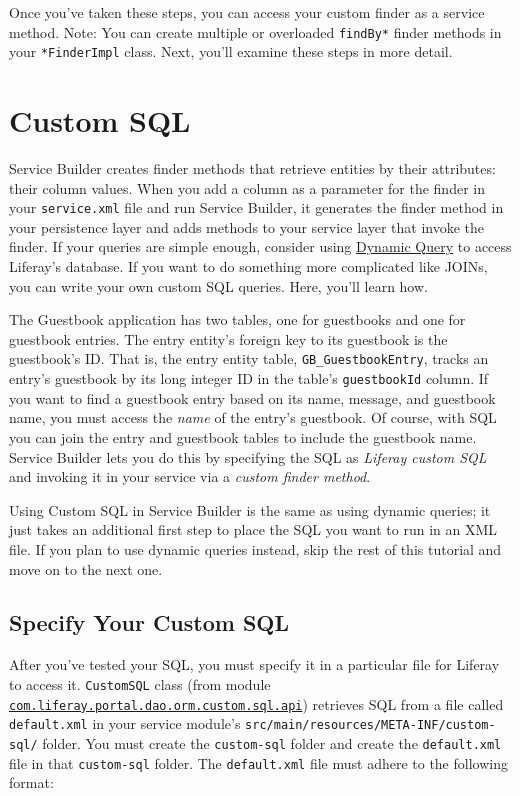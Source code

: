 Once you've taken these steps, you can access your custom finder as a
service method. Note: You can create multiple or overloaded
\texttt{findBy*} finder methods in your \texttt{*FinderImpl} class.
Next, you'll examine these steps in more detail.

\chapter{Custom SQL}\label{custom-sql}

Service Builder creates finder methods that retrieve entities by their
attributes: their column values. When you add a column as a parameter
for the finder in your \texttt{service.xml} file and run Service
Builder, it generates the finder method in your persistence layer and
adds methods to your service layer that invoke the finder. If your
queries are simple enough, consider using
\href{/docs/7-2/appdev/-/knowledge_base/a/dynamic-query}{Dynamic Query}
to access Liferay's database. If you want to do something more
complicated like JOINs, you can write your own custom SQL queries. Here,
you'll learn how.

The Guestbook application has two tables, one for guestbooks and one for
guestbook entries. The entry entity's foreign key to its guestbook is
the guestbook's ID. That is, the entry entity table,
\texttt{GB\_GuestbookEntry}, tracks an entry's guestbook by its long
integer ID in the table's \texttt{guestbookId} column. If you want to
find a guestbook entry based on its name, message, and guestbook name,
you must access the \emph{name} of the entry's guestbook. Of course,
with SQL you can join the entry and guestbook tables to include the
guestbook name. Service Builder lets you do this by specifying the SQL
as \emph{Liferay custom SQL} and invoking it in your service via a
\emph{custom finder method}.

Using Custom SQL in Service Builder is the same as using dynamic
queries; it just takes an additional first step to place the SQL you
want to run in an XML file. If you plan to use dynamic queries instead,
skip the rest of this tutorial and move on to the next one.

\section{Specify Your Custom SQL}\label{specify-your-custom-sql}

After you've tested your SQL, you must specify it in a particular file
for Liferay to access it. \texttt{CustomSQL} class (from module
\href{https://repository.liferay.com/nexus/content/repositories/liferay-public-releases/com/liferay/com.liferay.portal.dao.orm.custom.sql.api/}{\texttt{com.liferay.portal.dao.orm.custom.sql.api}})
retrieves SQL from a file called \texttt{default.xml} in your service
module's \texttt{src/main/resources/META-INF/custom-sql/} folder. You
must create the \texttt{custom-sql} folder and create the
\texttt{default.xml} file in that \texttt{custom-sql} folder. The
\texttt{default.xml} file must adhere to the following format:

